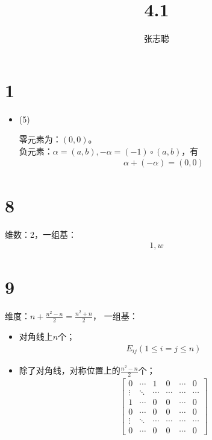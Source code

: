 \documentclass{article}
\begin{document}
\title{4.1}
\author{张志聪}
\maketitle

\section*{1}

\begin{itemize}
  \item (5)

        零元素为：$(0, 0)$。\\
        负元素：$ \alpha = (a, b), -\alpha = (-1) \circ (a, b)$，有
        \begin{align*}
          \alpha + (-\alpha) = (0, 0)
        \end{align*}



\end{itemize}

\section*{8}

维数：2，一组基：
\begin{align*}
  1, w
\end{align*}

\section*{9}

维度：$n + \frac{n^2 - n}{2} = \frac{n^2 + n}{2}$，
一组基：
\begin{itemize}
  \item 对角线上$n$个；
        \begin{align*}
          E_{ij} (1 \leq i=j \leq n)
        \end{align*}

  \item 除了对角线，对称位置上的$\frac{n^2 - n}{2}$个；
        \begin{align*}
          \begin{bmatrix}
            0      & \cdots & 1      & 0      & \cdots & 0      \\
            \vdots & \ddots & \cdots & \cdots & \cdots & \cdots \\
            1      & \cdots & 0      & 0      & \cdots & 0      \\
            0      & \cdots & 0      & 0      & \cdots & 0      \\
            \vdots & \ddots & \cdots & \cdots & \cdots & \cdots \\
            0      & \cdots & 0      & 0      & \cdots & 0
          \end{bmatrix}
        \end{align*}
\end{itemize}
\end{document}
